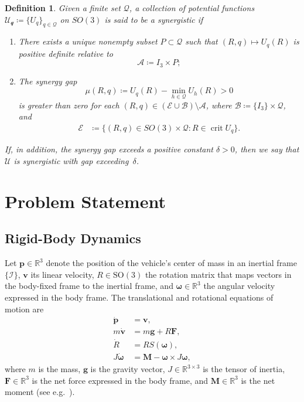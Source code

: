 \documentclass[journal]{IEEEtran}
\newtheorem{definition}{Definition}
\newcommand{\eye}[1]{I_{#1}}
\DeclareMathOperator{\crit}{crit}
\begin{document}
\begin{definition}
Given a finite set $\mathcal{Q}$, a collection of potential functions $\mathscr{U_q}\coloneqq\{U_q\}_{q\in\mathcal{Q}}$ on $SO(3)$ is said to be a synergistic if
\begin{enumerate}
  \item There exists a unique nonempty subset $P\subset\mathcal{Q}$ such that $(R,q)\mapsto U_q(R)$ is positive definite relative to $$\mathcal{A}\coloneqq\eye{3}\times P;$$
  \item The synergy gap
  $$\mu(R,q)\coloneqq U_q(R) - \min_{h\in\mathcal{Q}} U_h(R)>0$$
  is greater than zero for each $(R,q)\in (\mathcal{E}\cup\mathcal{B})\setminus\mathcal{A}$, where $\mathcal{B}\coloneqq\{\eye{3}\}\times\mathcal{Q}$, and
  \begin{align*} 
    \mathcal{E}&\coloneqq\{(R,q)\in SO(3)\times\mathcal{Q}: R\in\crit U_q\}.
  \end{align*}
\end{enumerate}
If, in addition, the synergy gap exceeds a positive constant $\delta>0$, then we say that $\mathscr{U}$ is synergistic with gap exceeding~$\delta$.
\end{definition}
\section{Problem Statement}

\subsection{Rigid-Body Dynamics}
Let $\bm{p}\in\mathbb{R}^3$ denote the position of the vehicle's center of mass in an inertial frame $\{\mathcal{I}\}$, $\bm{v}$ its linear velocity, $R\in\mathrm{SO}(3)$ the rotation matrix that maps vectors in the body-fixed frame to the inertial frame, and $\bm{\omega}\in\mathbb{R}^3$ the angular velocity expressed in the body frame.
The translational and rotational equations of motion are
\begin{equation}\label{eq:dynamics}
\begin{aligned}
\dot{\bm{p}} &= \bm{v},\\
 m\dot{\bm{v}} &= m\bm{g} + R\bm{F},\\
 \dot{R} &= RS(\bm{\omega}),\\
 J\dot{\bm{\omega}} &= \bm{M} - \bm{\omega}\times J\bm{\omega},
\end{aligned}
\end{equation}
where $m$ is the mass, $\bm{g}$ is the gravity vector, $J\in\mathbb{R}^{3\times3}$ is the tensor of inertia, $\bm{F}\in\mathbb{R}^3$ is the net force expressed in the body frame, and $\bm{M}\in\mathbb{R}^3$ is the net moment (see e.g.~\cite{bullo_geometric_2005}).
\end{document}
